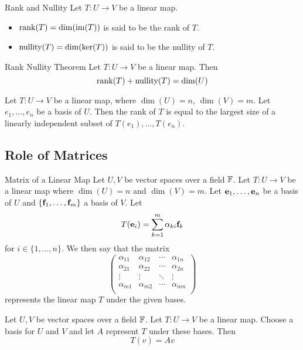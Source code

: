 \documentclass[a4paper]{article}
\begin{document}
\begin{defn}{Rank and Nullity}{} Let $T:U\to V$ be a linear map. 
\begin{itemize}
\item $\rank(T)=\dim(\operatorname{im}(T))$ is said to be the rank of $T$. 
\item $\operatorname{nullity}(T)=\dim(\ker(T))$ is said to be the nullity of $T$. 
\end{itemize}
\end{defn}

\begin{thm}{Rank Nullity Theorem}{} Let $T:U\to V$ be a linear map. Then $$\rank(T)+\operatorname{nullity}(T)=\dim(U)$$
\end{thm}

\begin{thm}{}{} Let $T:U\to V$ be a linear map, where $\dim(U)=n$, $\dim(V)=m$. Let $e_1,\dots,e_n$ be a basis of $U$. Then the rank of $T$ is equal to the largest size of a linearly independent subset of $T(e_1),\dots,T(e_n)$. 
\end{thm}

\subsection{Role of Matrices}
\begin{defn}{Matrix of a Linear Map}{} Let $U,V$ be vector spaces over a field $\mathbb{F}$. Let $T:U\to V$ be a linear map where $\dim(U)=n$ and $\dim(V)=m$. Let $\vb{e}_1,\dots,\vb{e}_n$ be a basis of $U$ and $\{\vb{f}_1,\dots,\vb{f}_m\}$ a basis of $V$. Let $$T(\vb{e}_i)=\sum_{k=1}^m\alpha_{ki}\vb{f}_k$$ for $i\in\{1,\dots,n\}$. We then say that the matrix $$\begin{pmatrix}
\alpha_{11} & \alpha_{12} & \cdots & \alpha_{1n}\\
\alpha_{21} & \alpha_{22} & \cdots & \alpha_{2n}\\
\vdots & \vdots & \ddots & \vdots\\
\alpha_{m1} & \alpha_{m2} & \cdots & \alpha_{mn}\\
\end{pmatrix}$$ represents the linear map $T$ under the given bases. 
\end{defn}

\begin{thm}{}{} Let $U,V$ be vector spaces over a field $\mathbb{F}$. Let $T:U\to V$ be a linear map. Choose a basis for $U$ and $V$ and let $A$ represent $T$ under these bases. Then $$T(v)=Av$$
\end{thm}
\end{document}
